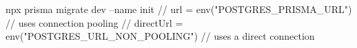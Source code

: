 npx prisma migrate dev --name init
// url       = env("POSTGRES_PRISMA_URL") // uses connection pooling
// directUrl = env("POSTGRES_URL_NON_POOLING") // uses a direct connection